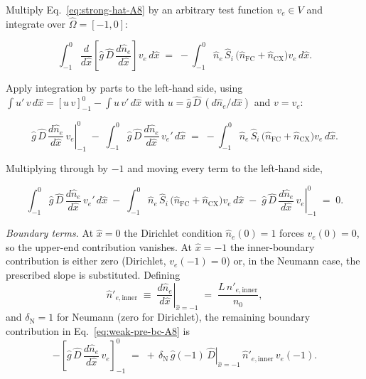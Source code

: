 \documentclass[twocolumn,secnumarabic,amssymb, nobibnotes, aps, prd]{revtex4-2}
\begin{document}
Multiply Eq.~\eqref{eq:strong-hat-A8} by an arbitrary test function
$v_{e}\in V$ and integrate over $\hat{\Omega} = [-1,0]$:
\begin{widetext}
\begin{equation}
  \int_{-1}^{0} \frac{d}{d\hat{x}}\!\left[\hat{g}\,\hat{D}\,\frac{d\hat{n}_{e}}{d\hat{x}}\right]v_{e}\,d\hat{x}
  \;=\;
  -\int_{-1}^{0} \hat{n}_{e}\,\hat{S}_{i}\,\bigl(\hat{n}_{\mathrm{FC}}+\hat{n}_{\mathrm{CX}}\bigr) v_{e}\,d\hat{x}.
\end{equation}
\end{widetext}
Apply integration by parts to the left-hand side, using
$\int u'\,v\,d\hat{x}=[u\,v]_{-1}^{0}-\int u\,v'\,d\hat{x}$ with
$u=\hat{g}\,\hat{D}\,(d\hat{n}_{e}/d\hat{x})$ and $v=v_{e}$:
\begin{widetext}
\begin{equation}
  \left.\hat{g}\,\hat{D}\,\frac{d\hat{n}_{e}}{d\hat{x}}\,v_{e}\right|_{-1}^{0}
  \;-\;\int_{-1}^{0}\hat{g}\,\hat{D}\,\frac{d\hat{n}_{e}}{d\hat{x}}\,v_{e}'\,d\hat{x}
  \;=\;
  -\int_{-1}^{0}\hat{n}_{e}\,\hat{S}_{i}\,\bigl(\hat{n}_{\mathrm{FC}}+\hat{n}_{\mathrm{CX}}\bigr) v_{e}\,d\hat{x}.
\end{equation}
\end{widetext}
Multiplying through by $-1$ and moving every term to the left-hand side,
\begin{widetext}
\begin{equation}
  \int_{-1}^{0}\hat{g}\,\hat{D}\,\frac{d\hat{n}_{e}}{d\hat{x}}\,v_{e}'\,d\hat{x}
  \;-\;\int_{-1}^{0}\hat{n}_{e}\,\hat{S}_{i}\,\bigl(\hat{n}_{\mathrm{FC}}+\hat{n}_{\mathrm{CX}}\bigr)v_{e}\,d\hat{x}
  \;-\;\left.\hat{g}\,\hat{D}\,\frac{d\hat{n}_{e}}{d\hat{x}}\,v_{e}\right|_{-1}^{0}
  \;=\;0.
  \label{eq:weak-pre-bc-A8}
\end{equation}
\end{widetext}

\textit{Boundary terms.}
At $\hat{x}=0$ the Dirichlet condition $\hat{n}_{e}(0)=1$ forces
$v_{e}(0)=0$, so the upper-end contribution vanishes. At
$\hat{x}=-1$ the inner-boundary contribution is either zero
(Dirichlet, $v_{e}(-1)=0$) or, in the Neumann case, the prescribed
slope is substituted. Defining
\begin{equation}
  \hat{n}'_{e,\mathrm{inner}}
  \;\equiv\; \left.\frac{d\hat{n}_{e}}{d\hat{x}}\right|_{\hat{x}=-1}
  \;=\; \frac{L\,n'_{e,\mathrm{inner}}}{n_{0}},
  \label{eq:hat-flux-A8}
\end{equation}
and $\delta_{\mathrm{N}}=1$ for Neumann (zero for Dirichlet), the
remaining boundary contribution in Eq.~\eqref{eq:weak-pre-bc-A8} is
\begin{equation}
  -\!\left[\hat{g}\,\hat{D}\,\frac{d\hat{n}_{e}}{d\hat{x}}\,v_{e}\right]_{-1}^{0}
  \;=\;
  +\,\delta_{\mathrm{N}}\,\hat{g}(-1)\,\left.\hat{D}\right|_{\hat{x}=-1}\,\hat{n}'_{e,\mathrm{inner}}\,v_{e}(-1).
\end{equation}
\end{document}

